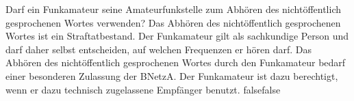     {Darf ein Funkamateur seine Amateurfunkstelle zum Abhören des nichtöffentlich gesprochenen Wortes verwenden?}
    {Das Abhören des nichtöffentlich gesprochenen Wortes ist ein Straftatbestand.}
    {Der Funkamateur gilt als sachkundige Person und darf daher selbst entscheiden, auf welchen Frequenzen er hören darf.}
    {Das Abhören des nichtöffentlich gesprochenen Wortes durch den Funkamateur bedarf einer besonderen Zulassung der BNetzA. }
    {Der Funkamateur ist dazu berechtigt, wenn er dazu technisch zugelassene Empfänger benutzt.}
    {false}{false}